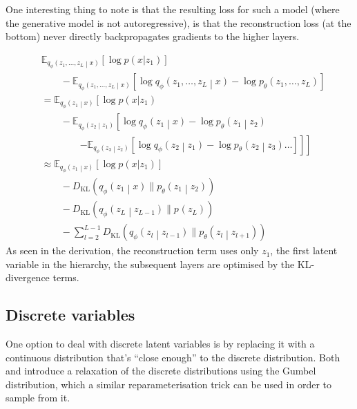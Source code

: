 \documentclass{article}
\newcommand{\prob}[3]{{#1}_{#2} \left( #3 \right)}
\newcommand{\condprob}[4]{{#1}_{#2} \left( #3 \middle| #4 \right)}
\newcommand{\expected}[2]{\mathbb{E}_{#1}\left[ #2 \right]}
\newcommand{\KL}[2]{D_{\mathrm{KL}}\left( #1 \| #2 \right)}
\begin{document}
One interesting thing to note is that the resulting loss for such a model (where the generative model is not autoregressive), is that the reconstruction loss (at the bottom) never directly backpropagates gradients to the higher layers.

\begin{align*}
&\expected{\condprob{q}{\phi}{z_1,\hdots,z_L}{x}}{\log p(x|z_1)} \\
&\qquad  - \expected{\condprob{q}{\phi}{z_1,\hdots,z_L}{x}}{\log \condprob{q}{\phi}{z_1,\hdots,z_L}{x} - 
 \log \prob{p}{\theta}{z_1,\hdots,z_L}
} \\
 &= \mathbb{E}_{\condprob{q}{\phi}{z_1}{x}}\left[{\log p(x|z_1)}\right. \\
&\qquad
	- \mathbb{E}_{\condprob{q}{\phi}{z_2}{z_1}}\left[
  	\log \condprob{q}{\phi}{z_1}{x} - 
 	\log \condprob{p}{\theta}{z_1}{z_2}\right.
\\
&\qquad\qquad\left.\left.
	- \mathbb{E}_{\condprob{q}{\phi}{z_3}{z_2}}\left[
  	\log \condprob{q}{\phi}{z_2}{z_1} - 
 	\log \condprob{p}{\theta}{z_2}{z_3} \hdots \right]\right]\right]
\\
 &\approx \expected{\condprob{q}{\phi}{z_1}{x}}{\log p(x|z_1)} \\
&\qquad - \KL{\condprob{q}{\phi}{z_1}{x}}{\condprob{p}{\theta}{z_1}{z_2}} \\
&\qquad - \KL{\condprob{q}{\phi}{z_L}{z_{L-1}}}{\prob{p}{}{z_L}} \\
&\qquad - \sum^{L-1}_{l=2} \KL{\condprob{q}{\phi}{z_l}{z_{l-1}}}{\condprob{p}{\theta}{z_l}{z_{l+1}}}
\end{align*}
As seen in the derivation, the reconstruction term uses only $z_1$, the first latent variable in the hierarchy, the subsequent layers are optimised by the KL-divergence terms.

\subsection{Discrete variables}
One option to deal with discrete latent variables is by replacing it with a continuous distribution that's ``close enough'' to the discrete distribution. Both \cite{maddison2016concrete} and \cite{jang2016categorical} introduce a relaxation of the discrete distributions using the Gumbel distribution, which a similar reparameterisation trick can be used in order to sample from it.
\end{document}

